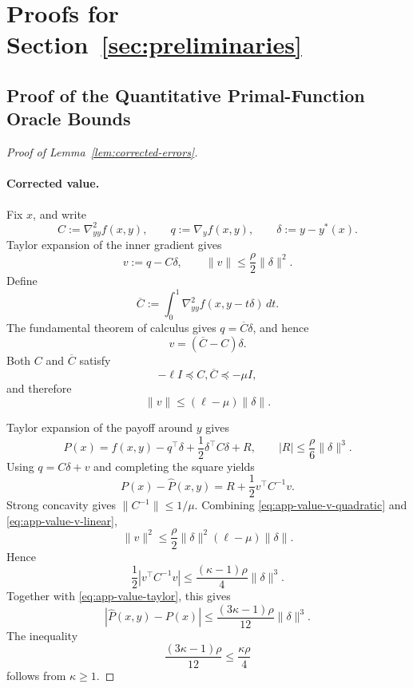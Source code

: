 \section{Proofs for Section~\ref{sec:preliminaries}}
\label{app:preliminaries}


\subsection{Proof of the Quantitative Primal-Function Oracle Bounds}
\label{app:corrected-estimators}

\begin{proof}[Proof of Lemma~\ref{lem:corrected-errors}]

\paragraph{Corrected value.}
Fix $x$, and write
\[
    C:=\nabla^2_{yy}f(x,y),
    \qquad
    q:=\nabla_yf(x,y),
    \qquad
    \delta:=y-y^*(x).
\]
Taylor expansion of the inner gradient gives
\begin{equation}
    v:=q-C\delta,
    \qquad
    \|v\|
    \le
    \frac{\rho}{2}\|\delta\|^2.
    \label{eq:app-value-v-quadratic}
\end{equation}
Define
\[
    \overline C
    :=
    \int_0^1
    \nabla^2_{yy}f(x,y-t\delta)\,dt.
\]
The fundamental theorem of calculus gives
$q=\overline C\delta$, and hence
\[
    v=(\overline C-C)\delta.
\]
Both $C$ and $\overline C$ satisfy
\[
    -\ell I
    \preceq
    C,\overline C
    \preceq
    -\mu I,
\]
and therefore
\begin{equation}
    \|v\|
    \le
    (\ell-\mu)\|\delta\|.
    \label{eq:app-value-v-linear}
\end{equation}

Taylor expansion of the payoff around $y$ gives
\begin{equation}
    P(x)
    =
    f(x,y)
    -
    q^\top\delta
    +
    \frac12\delta^\top C\delta
    +
    R,
    \qquad
    |R|
    \le
    \frac{\rho}{6}\|\delta\|^3.
    \label{eq:app-value-taylor}
\end{equation}
Using $q=C\delta+v$ and completing the square yields
\begin{equation}
    P(x)-\widehat P(x,y)
    =
    R+\frac12v^\top C^{-1}v.
    \label{eq:app-value-square}
\end{equation}
Strong concavity gives
$\|C^{-1}\|\le1/\mu$.
Combining
\eqref{eq:app-value-v-quadratic} and
\eqref{eq:app-value-v-linear},
\[
    \|v\|^2
    \le
    \frac{\rho}{2}\|\delta\|^2
    (\ell-\mu)\|\delta\|.
\]
Hence
\[
    \frac12
    |v^\top C^{-1}v|
    \le
    \frac{(\kappa-1)\rho}{4}\|\delta\|^3.
\]
Together with \eqref{eq:app-value-taylor}, this gives
\[
    |\widehat P(x,y)-P(x)|
    \le
    \frac{(3\kappa-1)\rho}{12}\|\delta\|^3.
\]
The inequality
\[
    \frac{(3\kappa-1)\rho}{12}
    \le
    \frac{\kappa\rho}{4}
\]
follows from $\kappa\ge1$.


\end{proof}
